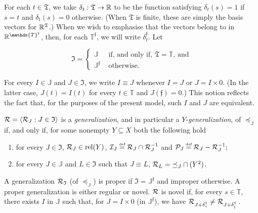 \documentclass[12pt,a4paper,twoside]{article}
\newcommand{\relations}{\operatorname{rel}}
\newcommand{\novel}{\mathfrak f}
\newcommand{\preceqb}{\mathbin{\preceq}}
\newcommand{\ext}{\mathrel{\mc R}}
\newcommand{\extb}{\mathbin{\mc R}}
\newcommand{\sextb}{\mathbin{\mc P}}
\newcommand{\nextb}{\mathbin{\mc I}}
\newcommand{\mbbt}{{\mathds {T}}}
\newcommand{\mbbtp}{{\mathds{T} ^ \novel }}
\newcommand{\mbbtpp}{{\mathfrak{T}}}
\newcommand{\mbbj}{\mathds J}
\newcommand{\mbbjp}{{\mathds {J}^{\novel}}}
\newcommand{\mbbjpp}{\mathfrak I}
\begin{document}
\begin{appendices}
For each $t \in \mbbtpp$, we take  $\delta_{t} : \mbbtpp \rightarrow \R$ to be
the function satisfying $\delta_{t} ( s ) = 1$ if $s = t$ and $\delta_{t} ( s ) = 0$
otherwise. (When $\mbbtpp$ is finite, these are simply the basis vectors for $\R^{\mbbtpp}$.)  When we wish to emphasise that the  vectors belong to in
$\R^{\mbbtp}$, then, for each $\mbbtp$, we will write $\delta_{t} ^{ \novel }$.
Let
\begin{linenomath*}
\begin{equation*}
 \mbbjpp  = \left \{
\begin{array}{ll}
\mbbj & \text{ if, and only if, $\mbbtpp = \mbbt$, and}    \\
 \mbbjp & \text{ otherwise.}
\end{array}\right.
\end{equation*}
\end{linenomath*}
For every $I \in \mbbj$ and $J \in \mbbjpp$, we write $I \equiv J$ whenever
$I = J$ or $J = I\times 0$. (In the latter case, $J(t)= I(t)$ for every
$t\in \mbbt$ and $J(\novel )= 0$.) This notion reflects the fact that, for the purposes
of the present model, such $I$ and $J$ are equivalent.
\begin{definition}\label{def-{generalization}Q}
 
$\extb =\langle \extb_{J}: J \in \mbbjpp \rangle$ is a
  \emph{{generalization}}, and in particular a $Y$-\emph{{generalization}}, of
  $\preceqb _{ \mbbj }$ if, and only if, for some nonempty
  $Y \subseteq X$ both the following hold
\begin{enumerate}

\item for every $J\in \mbbjpp$, $\extb_{J}\in \relations(Y)$,
  $\nextb_{J} \defeq \extb_{J} \cap \extb_{J} ^ { -1 }$ and
  $\sextb_{J} \defeq \extb_{J} \bs \extb_{J} ^ { -1 };$

\item for every $J \in \mbbj$ and $L \in \mbbjpp$ such that $J \equiv
  L$, $\extb_{L} = \preceqb_{J} \cap (Y ^ 2)$. \label{item-preservingQ}
\end{enumerate}
A {generalization} $\ext_{\mbbjpp}$ (of $\preceq_{\mbbj}$) is proper if $\mbbjpp=
\mbbjp$ and improper otherwise.  A proper {generalization} is either regular or
novel. $\ext$ is novel if, for every $s \in \mbbt$, there exists $I$ in $\mbbj$ such that, for $J = I \times 0$ (in $\mbbjp$), we have $\extb _ { J +
  \delta _{s} ^{ \novel } } \neq \extb _ { J + \delta _ { \novel} ^{ \novel }
}$\,.
 \end{definition} 


\end{appendices}
\end{document}
